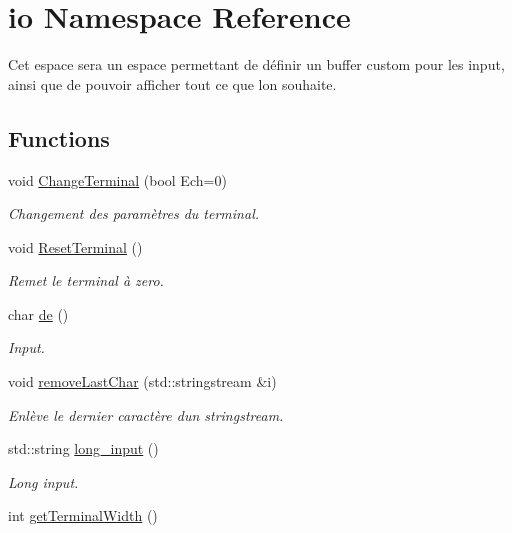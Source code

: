 \hypertarget{namespaceio}{}\section{io Namespace Reference}
\label{namespaceio}


Cet espace sera un espace permettant de définir un buffer custom pour les input, ainsi que de pouvoir afficher tout ce que l\textquotesingle{}on souhaite.  


\subsection*{Functions}
\begin{DoxyCompactItemize}
\item 
void \hyperlink{namespaceio_ac0223d0ecfee82d8cc86543604173b73}{Change\+Terminal} (bool Ech=0)
\begin{DoxyCompactList}\small\item\em Changement des paramètres du terminal. \end{DoxyCompactList}\item 
void \hyperlink{namespaceio_a44a79937063c75bdcd8f042d5f55d501}{Reset\+Terminal} ()
\begin{DoxyCompactList}\small\item\em Remet le terminal à zero. \end{DoxyCompactList}\item 
char \hyperlink{namespaceio_ae9908b55f26f07e78043d7cfad003d22}{de} ()
\begin{DoxyCompactList}\small\item\em Input. \end{DoxyCompactList}\item 
void \hyperlink{namespaceio_a0ed486192687092d372440a79c3a65a3}{remove\+Last\+Char} (std\+::stringstream \&i)
\begin{DoxyCompactList}\small\item\em Enlève le dernier caractère d\textquotesingle{}un stringstream. \end{DoxyCompactList}\item 
std\+::string \hyperlink{namespaceio_ab044be3afd7ac04eeb1a496af0f1d5c6}{long\+\_\+input} ()
\begin{DoxyCompactList}\small\item\em Long input. \end{DoxyCompactList}\item 
int \hyperlink{namespaceio_a71636a15a219ee1dcc177e9749cf20bc}{get\+Terminal\+Width} ()

\end{DoxyCompactItemize}
